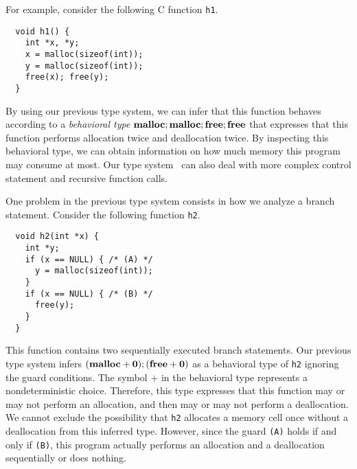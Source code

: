 
For example, consider the following C function \verb|h1|.
\begin{verbatim}
  void h1() {
    int *x, *y;
    x = malloc(sizeof(int));
    y = malloc(sizeof(int));
    free(x); free(y);
  }
\end{verbatim}
By using our previous type system, we can infer that this function
behaves according to a \emph{behavioral type}
$\mathbf{malloc};\mathbf{malloc};\mathbf{free};\mathbf{free}$ that expresses that this function performs
allocation twice and deallocation twice.  By inspecting this behavioral
type, we can obtain information on how much memory this program may
consume at most.  Our type system~\cite{} can also deal with more
complex control statement and recursive function calls.

One problem in the previous type system consists in how we analyze a
branch statement.  Consider the following function \verb|h2|.
\begin{verbatim}
  void h2(int *x) {
    int *y;
    if (x == NULL) { /* (A) */
      y = malloc(sizeof(int));
    }
    if (x == NULL) { /* (B) */
      free(y);
    }
  }
\end{verbatim}
This function contains two sequentially executed branch statements.  Our
previous type system infers $(\mathbf{malloc} + \mathbf{0}); (\mathbf{free} + \mathbf{0})$ as a
behavioral type of \verb|h2| ignoring the guard conditions.  The symbol
$+$ in the behavioral type represents a nondeterministic choice.
Therefore, this type expresses that this function may or may not perform
an allocation, and then may or may not perform a deallocation.  We
cannot exclude the possibility that \verb|h2| allocates a memory cell
once without a deallocation from this inferred type.  However, since the
guard \verb|(A)| holds if and only if \verb|(B)|, this program actually
performs an allocation and a deallocation sequentially or does nothing.

